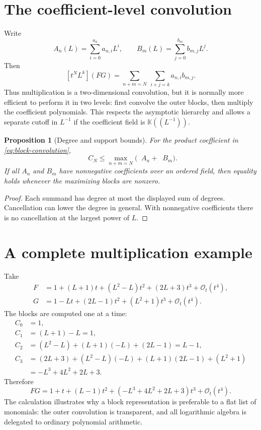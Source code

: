 \documentclass[11pt,oneside]{book}
\newtheorem{proposition}[theorem]{Proposition}
\theoremstyle{definition}
\theoremstyle{remark}
\DeclareMathOperator{\degL}{deg_{\!L}}
\newcommand{\K}{\mathbb K}
\newcommand{\bigO}{\mathcal O}
\begin{document}
\section{The coefficient-level convolution}
Write
\[
 A_n(L)=\sum_{i=0}^{a_n}a_{n,i}L^i,
 \qquad
 B_m(L)=\sum_{j=0}^{b_m}b_{m,j}L^j.
\]
Then
\begin{equation}\label{eq:two-dimensional-convolution}
 [t^NL^k](FG)
 =\sum_{n+m=N}\ \sum_{i+j=k}a_{n,i}b_{m,j}.
\end{equation}
Thus multiplication is a two-dimensional convolution, but it is normally
more efficient to perform it in two levels: first convolve the outer blocks,
then multiply the coefficient polynomials.  This respects the asymptotic
hierarchy and allows a separate cutoff in $L^{-1}$ if the coefficient field is
$\K((L^{-1}))$.

\begin{proposition}[Degree and support bounds]\label{prop:degree-bounds}
For the product coefficient in \eqref{eq:block-convolution},
\[
 \degL C_N\le
 \max_{n+m=N}\bigl(\degL A_n+\degL B_m\bigr).
\]
If all $A_n$ and $B_m$ have nonnegative coefficients over an ordered field,
then equality holds whenever the maximizing blocks are nonzero.
\end{proposition}
\begin{proof}
Each summand has degree at most the displayed sum of degrees.  Cancellation
can lower the degree in general.  With nonnegative coefficients there is no
cancellation at the largest power of $L$.
\end{proof}

\section{A complete multiplication example}
Take
\begin{align*}
 F&=1+(L+1)t+(L^2-L)t^2+(2L+3)t^3+\bigO_t(t^4),\\
 G&=1-Lt+(2L-1)t^2+(L^2+1)t^3+\bigO_t(t^4).
\end{align*}
The blocks are computed one at a time:
\begin{align*}
 C_0&=1,\\
 C_1&=(L+1)-L=1,\\
 C_2&=(L^2-L)+(L+1)(-L)+(2L-1)
      =L-1,\\
 C_3&=(2L+3)+(L^2-L)(-L)+(L+1)(2L-1)+(L^2+1)\\
    &=-L^3+4L^2+2L+3.
\end{align*}
Therefore
\begin{equation}\label{eq:product-example}
 FG=1+t+(L-1)t^2+(-L^3+4L^2+2L+3)t^3+\bigO_t(t^4).
\end{equation}
The calculation illustrates why a block representation is preferable to a
flat list of monomials: the outer convolution is transparent, and all
logarithmic algebra is delegated to ordinary polynomial arithmetic.
\end{document}
